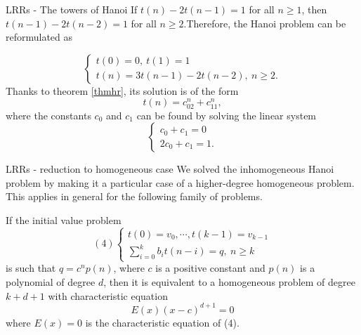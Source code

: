 \documentclass{beamer}
\begin{document}
\begin{frame}{LRRs - The towers of Hanoi}
	If $t(n) - 2t(n-1) = 1$ for all $n \geq 1$, then $t(n-1) - 2t(n-2) = 1$ for
	all $n \geq 2$.\pause Therefore, the Hanoi problem can be reformulated as

	\begin{displaymath}
		\begin{cases}
			t(0)= 0,\ t(1)= 1\\
			t(n)= 3t(n-1) - 2t(n-2),\ n \geq 2.
		\end{cases}
	\end{displaymath}\pause
	Thanks to theorem \ref{thmhr}, its solution is of the form
	\begin{equation*}
		t(n) = c_02^n + c_11^n,
	\end{equation*}
	where the constants $c_0$ and $c_1$ can be found by solving the linear
	system
	\begin{displaymath}
		\begin{cases}
			c_0 + c_1 = 0\\
			2c_0 + c_1 = 1.
		\end{cases}
	\end{displaymath}
\end{frame}

%

\begin{frame}{LRRs - reduction to homogeneous case}
	We solved the inhomogeneous Hanoi problem by making it a particular case
	of a higher-degree homogeneous problem. This applies in general for the
	following family of problems.\pause
	\begin{thm}[2]
		If the initial value problem
		\begin{displaymath}(4)
			\begin{cases}
				t(0)= v_0, \cdots, t(k-1)= v_{k-1}\\
				\sum_{i= 0}^k b_it(n-i)= q,\ n \geq k
			\end{cases}
		\end{displaymath}
		is such that $q = c^np(n)$, where $c$ is a positive constant and
		$p(n)$ is a polynomial of degree $d$, then it is equivalent to a
		homogeneous problem of degree $k+d+1$ with characteristic equation
		\begin{equation}
			E(x)(x-c)^{d+1} = 0
		\end{equation}
		where $E(x) = 0$ is the characteristic equation of (4).
	\end{thm}
\end{frame}
\end{document}
